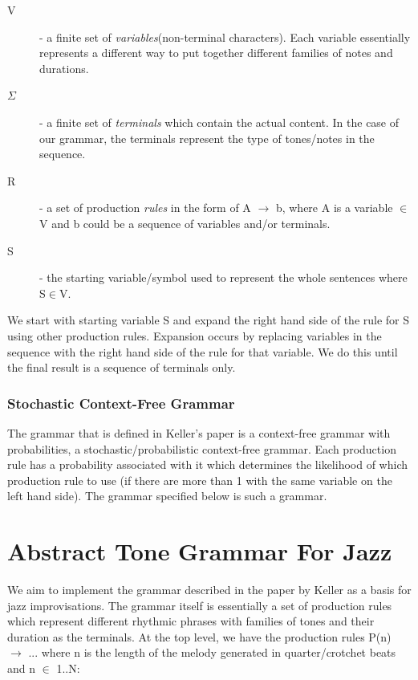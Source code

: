 \documentclass[pdftex,12pt,a4paper]{report}
\begin{document}
\begin{description}
  \item[V] - a finite set of \emph{variables}(non-terminal characters). Each variable essentially represents a different way to put together different families of notes and durations.
  \item[$\Sigma$]  - a finite set of \emph{terminals} which contain the actual content. In the case of our grammar, the terminals represent the type of tones/notes in the sequence.
  \item[R] - a set of production \emph{rules} in the form of A $\rightarrow$ b, where A is a variable $\in$V and b could be a sequence of variables and/or terminals.
  \item[S] - the starting variable/symbol used to represent the whole sentences where S$\in$V.
\end{description}


We start with starting variable S and expand the right hand side of the rule for S using other production rules. Expansion occurs by replacing variables in the sequence with the right hand side of the rule for that variable. We do this until the final result is a sequence of terminals only.

\subsubsection{Stochastic Context-Free Grammar}
The grammar that is defined in Keller's paper \cite{keller07} is a context-free grammar with probabilities, a stochastic/probabilistic context-free grammar. Each production rule has a probability associated with it which determines the likelihood of which production rule to use (if there are more than 1 with the same variable on the left hand side). The grammar specified below is such a grammar.

\section{Abstract Tone Grammar For Jazz}
We aim to implement the grammar described in the paper by Keller \cite{keller07} as a basis for jazz improvisations. The grammar itself is essentially a set of production rules which represent different rhythmic phrases with families of tones and their duration as the terminals. At the top level, we have the production rules P(n) $\rightarrow$ ... where n is the length of the melody generated in quarter/crotchet beats and n $\in$ 1..N:
\end{document}
